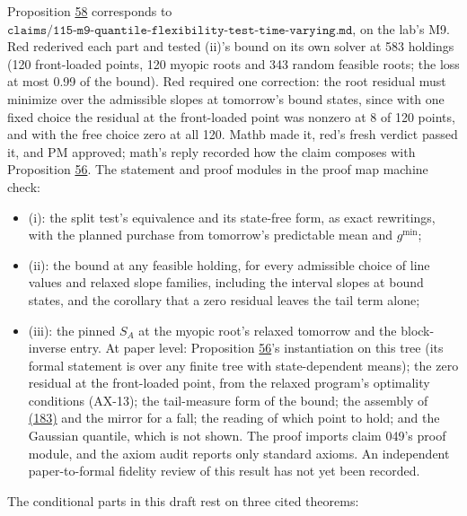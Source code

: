 \documentclass[11pt]{article}
\begin{document}
Proposition \hyperref[res:Proposition-58]{58} corresponds to
\(\texttt{claims/115-m9-quantile-flexibility-test-time-varying.md}\), on the lab's
M9. Red rederived each part and tested (ii)'s bound on its own solver
at 583 holdings (120 front-loaded points, 120 myopic roots and 343
random feasible roots; the loss at most 0.99 of the bound). Red required
one correction: the root residual must minimize over the admissible
slopes at tomorrow's bound states, since with one fixed choice the
residual at the front-loaded point was nonzero at 8 of 120 points, and
with the free choice zero at all 120. Mathb made it, red's fresh
verdict passed it, and PM approved; math's reply recorded how the
claim composes with Proposition \hyperref[res:Proposition-56]{56}. The statement and proof modules in
the proof map machine check:

\begin{itemize}
  \item (i): the split test's equivalence and its state-free form, as exact
  rewritings, with the planned purchase from tomorrow's predictable
  mean and \(g^{\min}\);
  \item (ii): the bound at any feasible holding, for every admissible choice
  of line values and relaxed slope families, including the interval
  slopes at bound states, and the corollary that a zero residual leaves
  the tail term alone;
  \item (iii): the pinned \(S_A\) at the myopic root's relaxed tomorrow and the
  block-inverse entry.
At paper level: Proposition \hyperref[res:Proposition-56]{56}'s instantiation on this tree (its formal
statement is over any finite tree with state-dependent means); the
zero residual at the front-loaded point, from the relaxed program's
optimality conditions (AX-13); the tail-measure form of the bound; the
assembly of \hyperref[eq:183]{(183)} and the mirror for a fall; the reading of which
point to hold; and the Gaussian quantile, which is not shown.
The proof imports claim 049's proof module, and the axiom audit reports
only standard axioms. An independent paper-to-formal fidelity review
of this result has not yet been recorded.
\end{itemize}

The conditional parts in this draft rest on three cited theorems:
\end{document}
